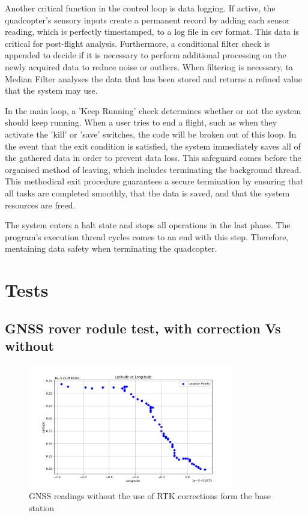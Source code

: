 \documentclass{report}
\begin{document}
Another critical function in the control loop is data logging. If active, the
quadcopter's sensory inputs create a permanent record by adding each sensor reading,
which is perfectly timestamped, to a log file in csv format. This data is
critical for post-flight analysis. Furthermore, a conditional filter check is
appended to decide if it is necessary to perform additional processing on the
newly acquired data to reduce noise or outliers. When filtering is necessary, ta
Median Filter analyses the data that has been stored and returns a refined value
that the system may use.

In the main loop, a 'Keep Running' check determines whether or not the system
should keep running. When a user tries to end a flight, such as when they
activate the 'kill' or 'save' switches, the code will be broken out of this
loop. In the event that the exit condition is satisfied, the system immediately
saves all of the gathered data in order to prevent data loss. This safeguard
comes before the organised method of leaving, which includes terminating the
background thread. This methodical exit procedure guarantees a secure
termination by ensuring that all tasks are completed smoothly, that the data is
saved, and that the system resources are freed.

The system enters a halt state and stops all operations in the last phase. The
program’s execution thread cycles comes to an end with this step. Therefore,
mentaining data safety when terminating the quadcopter.


\chapter{Tests}\label{tests}

\section{GNSS rover rodule test, with correction Vs
without}\label{GNSS_rover_module}
\begin{figure}[H]
  \centering
  \includegraphics[width=0.8\textwidth]{Pictures/GNSS_no_RTK.png}
  \caption{GNSS readings without the use of RTK corrections form the base station}
  \label{fig:GNSS_no_RTK}
\end{figure}
\end{document}

